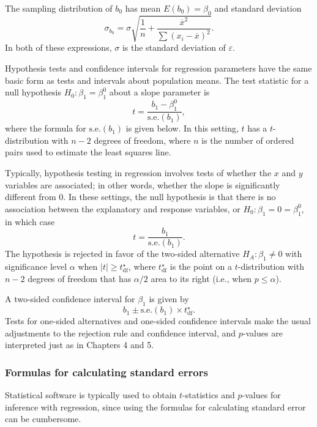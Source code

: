 The sampling distribution of $b_0$ has mean $E(b_0) = \beta_0$ and standard deviation 
\[\sigma_{b_0} = \sigma \sqrt{\frac{1}{n} + \frac{\overline{x}^2}{\sum(x_i - \overline{x})^2}}.\]
In both of these expressions, $\sigma$ is the standard deviation of $\varepsilon$.

Hypothesis tests and confidence intervals for regression parameters have the same basic form as tests and intervals about population means. The test statistic for a null hypothesis $H_0: \beta_1 = \beta^0_1$ about a slope parameter is
\[t = \frac{b_1 - \beta^0_1}{\text{s.e.}(b_1)},\]
where the formula for $\text{s.e.}(b_1)$ is given below.
In this setting, $t$ has a $t$-distribution with $n - 2$ degrees of freedom, where $n$ is the number of ordered pairs used to estimate the least squares line.  


Typically, hypothesis testing in regression involves tests of whether the $x$ and $y$ variables are associated; in other words, whether the slope is significantly different from 0. In these settings, the null hypothesis is that there is no association between the explanatory and response variables, or $H_0: \beta_1 = 0 = \beta^0_1$, in which case
\[t = \frac{b_1}{\text{s.e.}(b_1)}.\]
The hypothesis is rejected in favor of the two-sided alternative $H_A: \beta_1 \neq 0$ with significance level $\alpha$ when $|t| \ge t^\star_{\text{df}}$, where $t^\star_{\text{df}}$ is the point on a $t$-distribution with $n-2$ degrees of freedom that has $\alpha/2$ area to its right (i.e., when $p \leq \alpha$).


A two-sided confidence interval for $\beta_1$ is given by 
\[b_1 \pm \text{s.e.}(b_1) \times t^\star_{\text{df}}.\]
Tests for one-sided alternatives and one-sided confidence intervals make the usual adjustments to the rejection rule and confidence interval, and $p$-values are interpreted just as in Chapters 4 and 5.

\subsubsection{Formulas for calculating standard errors}


Statistical software is typically used to obtain $t$-statistics and $p$-values for inference with regression, since using the formulas for calculating standard error can be cumbersome.

